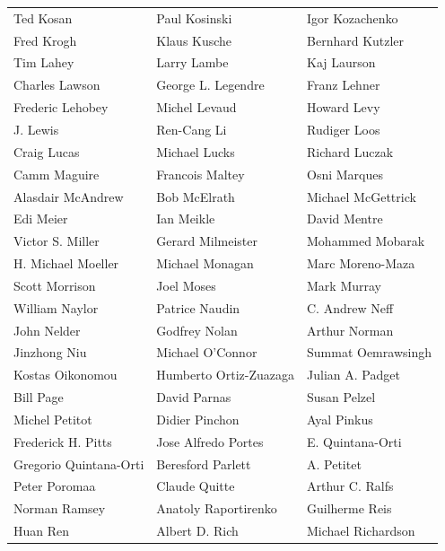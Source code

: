 \begin{tabular}{lll}
Ted Kosan              & Paul Kosinski          & Igor Kozachenko\\
Fred Krogh             & Klaus Kusche           & Bernhard Kutzler\\
Tim Lahey              & Larry Lambe            & Kaj Laurson\\
Charles Lawson         & George L. Legendre     & Franz Lehner\\
Frederic Lehobey       & Michel Levaud          & Howard Levy\\
J. Lewis               & Ren-Cang Li            & Rudiger Loos\\
Craig Lucas            & Michael Lucks          & Richard Luczak\\
Camm Maguire           & Francois Maltey        & Osni Marques\\
Alasdair McAndrew      & Bob McElrath           & Michael McGettrick\\
Edi Meier              & Ian Meikle             & David Mentre\\
Victor S. Miller       & Gerard Milmeister      & Mohammed Mobarak\\
H. Michael Moeller     & Michael Monagan        & Marc Moreno-Maza\\
Scott Morrison         & Joel Moses             & Mark Murray\\
William Naylor         & Patrice Naudin         & C. Andrew Neff\\
John Nelder            & Godfrey Nolan          & Arthur Norman\\
Jinzhong Niu           & Michael O'Connor       & Summat Oemrawsingh\\
Kostas Oikonomou       & Humberto Ortiz-Zuazaga & Julian A. Padget\\
Bill Page              & David Parnas           & Susan Pelzel\\
Michel Petitot         & Didier Pinchon         & Ayal Pinkus\\
Frederick H. Pitts     & Jose Alfredo Portes    & E. Quintana-Orti\\
Gregorio Quintana-Orti & Beresford Parlett      & A. Petitet\\
Peter Poromaa          & Claude Quitte          & Arthur C. Ralfs\\
Norman Ramsey          & Anatoly Raportirenko   & Guilherme Reis\\
Huan Ren               & Albert D. Rich         & Michael Richardson\\

\end{tabular}
